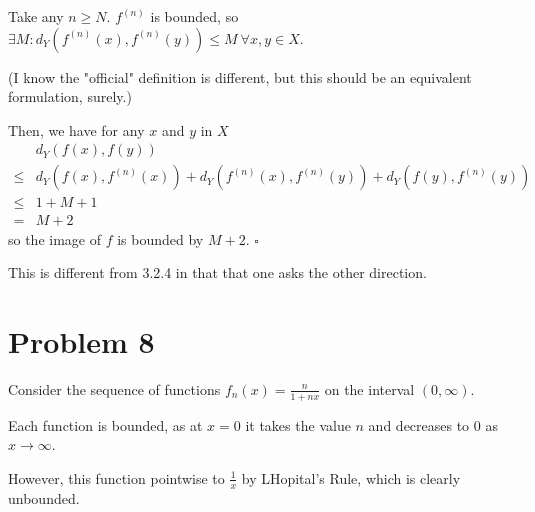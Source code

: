 \documentclass[12pt]{article}
\begin{document}
Take any $n \ge N$.
$f^{(n)}$ is bounded, so $\exists M: d_Y\left(f^{(n)}(x), f^{(n)}(y)\right) \le M\ \forall x, y \in X$.

(I know the "official" definition is different, but this should be an equivalent formulation, surely.)

Then, we have for any $x$ and $y$ in $X$
\begin{align*}
        & d_Y(f(x), f(y))                                                                                              \\
  \le{} & d_Y\left(f(x), f^{(n)}(x)\right) + d_Y\left(f^{(n)}(x), f^{(n)}(y)\right) + d_Y\left(f(y), f^{(n)}(y)\right) \\
  \le{} & 1 + M + 1                                                                                                    \\
  ={}   & M+2
\end{align*}
so the image of $f$ is bounded by $M+2$. $\square$

This is different from 3.2.4 in that that one asks the other direction.

\section{Problem 8}

Consider the sequence of functions $f_n(x)=\frac{n}{1+nx}$ on the interval $(0, \infty)$.

Each function is bounded, as at $x=0$ it takes the value $n$ and decreases to $0$ as $x \to \infty$.

However, this function pointwise to $\frac{1}{x}$ by LHopital's Rule,
which is clearly unbounded.
\end{document}
